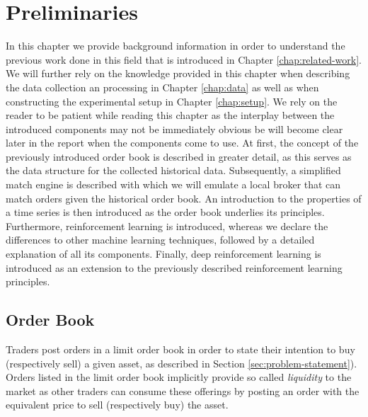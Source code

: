 \chapter{Preliminaries}
\label{chap:preliminaries}

In this chapter we provide background information in order to understand the previous work done in this field that is introduced in Chapter \ref{chap:related-work}.
We will further rely on the knowledge provided in this chapter when describing the data collection an processing in Chapter \ref{chap:data} as well as when constructing the experimental setup in Chapter \ref{chap:setup}.
We rely on the reader to be patient while reading this chapter as the interplay between the introduced components may not be immediately obvious be will become clear later in the report when the components come to use.
At first, the concept of the previously introduced order book is described in greater detail, as this serves as the data structure for the collected historical data.
Subsequently, a simplified match engine is described with which we will emulate a local broker that can match orders given the historical order book.
An introduction to the properties of a time series is then introduced as the order book underlies its principles.
Furthermore, reinforcement learning is introduced, whereas we declare the differences to other machine learning techniques, followed by a detailed explanation of all its components.
Finally, deep reinforcement learning is introduced as an extension to the previously described reinforcement learning principles.

\section{Order Book}

Traders post orders in a limit order book in order to state their intention to buy (respectively sell) a given asset, as described in Section \ref{sec:problem-statement}).
Orders listed in the limit order book implicitly provide so called \textit{liquidity} to the market as other traders can consume these offerings by posting an order with the equivalent price to sell (respectively buy) the asset.

